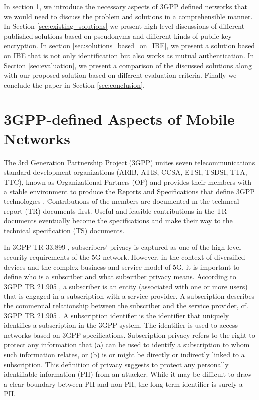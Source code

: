 \documentclass[runningheads,a4paper]{llncs} %
\begin{document}
In section \ref{sec:3GPP-defined_aspects_of_mobile_network}, we introduce the necessary aspects of 3GPP defined networks that we would need to discuss the problem and solutions in a comprehensible manner. In Section \ref{sec:existing_solutions} we present high-level discussions of different published solutions based on pseudonyms and different kinds of public-key encryption. In section  \ref{sec:solutions_based_on_IBE}, we present a solution based on IBE that is not only identification but also works as mutual authentication. In Section \ref{sec:evaluation}, we present a comparison of the discussed solutions along with our proposed solution based on different evaluation criteria. Finally we conclude the paper in Section \ref{sec:conclusion}.

\section{3GPP-defined Aspects of Mobile Networks}
\label{sec:3GPP-defined_aspects_of_mobile_network}
The 3rd Generation Partnership Project (3GPP) unites seven telecommunications standard development organizations (ARIB, ATIS, CCSA, ETSI, TSDSI, TTA, TTC), known as Organizational Partners (OP) and provides their members with a stable environment to produce the Reports and Specifications that define 3GPP technologies \cite{3gpp_intro}. Contributions of the members are documented in the technical report (TR) documents first. Useful and feasible contributions in the TR documents eventually become the specifications and make their way to the technical specification (TS) documents. 

In 3GPP TR 33.899 \cite{TR33899}, subscribers' privacy is captured as one of the high level security requirements of the 5G network. However, in the context of diversified devices and the complex business and service model of 5G, it is important to define who is a subscriber and what subscriber privacy means. According to 3GPP TR 21.905 \cite{TR21905}, a subscriber is an entity (associated with one or more users) that is engaged in a subscription with a service provider. A subscription describes the commercial relationship between the subscriber and the service provider, cf. 3GPP TR 21.905 \cite{TR21905}. A subscription identifier is the identifier that uniquely identifies a subscription in the 3GPP system. The identifier is used to access networks based on 3GPP specifications. Subscription privacy refers to the right to protect any information that (a) can be used to identify a subscription to whom such information relates, or (b) is or might be directly or indirectly linked to a subscription. This definition of privacy suggests to protect any personally identifiable information (PII) from an attacker. While it may be difficult to draw a clear boundary between PII and non-PII, the long-term identifier is surely a PII. 
\end{document}
